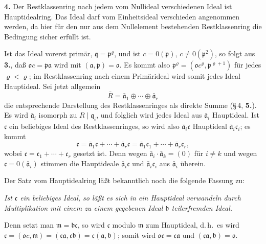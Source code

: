 \documentclass[12pt,a4paper]{article}
\theoremstyle{plain}
\theoremstyle{definition}
\theoremstyle{remark}
\begin{document}
\medskip
\noindent
\textbf{4.} Der Restklassenring nach jedem vom Nullideal verschiedenen Ideal ist Hauptidealring. Das Ideal darf vom Einheitsideal verschieden angenommen werden, da hier für den nur aus dem Nullelement bestehenden Restklassenring die Bedingung sicher erfüllt ist.

Ist das Ideal vorerst primär, $\mathfrak{q} = \mathfrak{p}^{\varrho}$, und ist $c = 0(\mathfrak{p})$, $c \neq 0(\mathfrak{p}^{2})$, so folgt aus \textbf{3.}, daß $\mathfrak{o}c = \mathfrak{p}\mathfrak{a}$ wird mit $(\mathfrak{a}, \mathfrak{p}) = \mathfrak{o}$. Es kommt also $\mathfrak{p}^{\varrho} = (\mathfrak{o}c^{\varrho}, \mathfrak{p}^{\varrho+1})$ für jedes $\varrho < \varrho$; im Restklassenring nach einem Primärideal wird somit jedes Ideal Hauptideal. Sei jetzt allgemein
\[
\bar{R} = \bar{\mathfrak{a}}_{1} \oplus \cdots \oplus \bar{\mathfrak{a}}_{r}
\]
die entsprechende Darstellung des Restklassenringes als direkte Summe (\S\,4, \textbf{5.}). Es wird $\bar{\mathfrak{a}}_{i}$ isomorph zu $R \mid \mathfrak{q}_{i}$, und folglich wird jedes Ideal aus $\bar{\mathfrak{a}}_{i}$ Hauptideal. Ist $\mathfrak{c}$ ein beliebiges Ideal des Restklassenringes, so wird also $\bar{\mathfrak{a}}_{i}\mathfrak{c}$ Hauptideal $\bar{\mathfrak{a}}_{i}\mathfrak{c}_{i}$; es kommt
\[
\mathfrak{c} = \bar{\mathfrak{a}}_{1}\mathfrak{c} + \cdots + \bar{\mathfrak{a}}_{r}\mathfrak{c} = \bar{\mathfrak{a}}_{1}\mathfrak{c}_{1} + \cdots + \bar{\mathfrak{a}}_{r}\mathfrak{c}_{r},
\]
wobei $\mathfrak{c} = \mathfrak{c}_{1} + \cdots + \mathfrak{c}_{r}$ gesetzt ist. Denn wegen $\bar{\mathfrak{a}}_{i} \cdot \bar{\mathfrak{a}}_{k} = (0)$ für $i \neq k$ und wegen $\mathfrak{c} = 0(\bar{\mathfrak{a}}_{i})$ stimmen die Hauptideale $\bar{\mathfrak{a}}_{i}\mathfrak{c}$ und $\bar{\mathfrak{a}}_{i}\mathfrak{c}_{i}$ aus $\bar{\mathfrak{a}}_{i}$ überein.

Der Satz vom Hauptidealring läßt bekanntlich noch die folgende Fassung zu:

\textit{Ist $\mathfrak{c}$ ein beliebiges Ideal, so läßt es sich in ein Hauptideal verwandeln durch Multiplikation mit einem zu einem gegebenen Ideal $\mathfrak{b}$ teilerfremden Ideal.}

Denn setzt man $\mathfrak{m} = \mathfrak{b}\mathfrak{c}$, so wird $\mathfrak{c}$ modulo $\mathfrak{m}$ zum Hauptideal, d.\,h.\ es wird $\mathfrak{c} = (\mathfrak{o}c, \mathfrak{m}) = (\mathfrak{c}\mathfrak{a}, \mathfrak{c}\mathfrak{b}) = \mathfrak{c}(\mathfrak{a}, \mathfrak{b})$; somit wird $\mathfrak{o}\mathfrak{c} = \mathfrak{c}\mathfrak{a}$ und $(\mathfrak{c}\mathfrak{a}, \mathfrak{b}) = \mathfrak{o}$.
\end{document}
